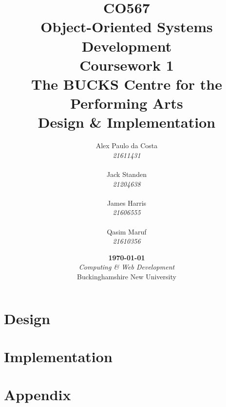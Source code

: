 \documentclass{report}
\title{
    \fontspec[Path=.fonts/]{LibertineDisplay.ttf}
    \Large CO567\\
    Object-Oriented Systems Development\\
    Coursework 1\vspace*{.65cm}\\
    \huge The BUCKS Centre for the Performing Arts\\
    Design \& Implementation\vfill
}
\author{
    Alex Paulo da Costa\\
    \textit{21611431}\\
    \hfill\\
    Jack Standen\\
    \textit{21204638}\\
    \hfill\\
    James Harris\\
    \textit{21606555}\\
    \hfill\\
    Qasim Maruf\\
    \textit{21610356}
}
\date{
    \vfill\textbf{\today}\\
    \vspace*{.75cm}\textit{Computing \& Web Development}\\
    Buckinghamshire New University
}
\begin{document}
    \maketitle
    \tableofcontents

    \part{Design}
    
    
    
    

    \part{Implementation}
    
    
    
    
    

    \part{Appendix}
    
\end{document}
